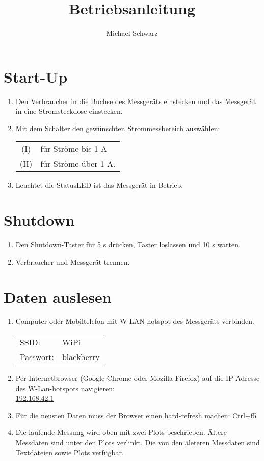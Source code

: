 \documentclass[a4paper]{article}
\title{Betriebsanleitung}
\author{Michael Schwarz}
\begin{document}
\maketitle

\section{Start-Up}
\begin{enumerate}
\item Den Verbraucher in die Buchse des Messgeräts einstecken und das Messgerät in eine Stromsteckdose einstecken.
\item Mit dem Schalter den gewünschten Strommessbereich auswählen: \\
	\begin{tabular}{c l}
		(I) & für Ströme bis 1 A \\
		(II) & für Ströme über 1 A.
	\end{tabular}
\item Leuchtet die StatusLED ist das Messgerät in Betrieb.
\end{enumerate}

\section{Shutdown}
\begin{enumerate}
	\item Den Shutdown-Taster für 5 s drücken, Taster loslassen und 10 s warten.
	\item Verbraucher und Messgerät trennen.
\end{enumerate}

\section{Daten auslesen}
\begin{enumerate}
	\item Computer oder Mobiltelefon mit W-LAN-hotspot des Messgeräts verbinden. \\
		\begin{tabular}{l l}
			SSID: & WiPi \\
			Passwort: & blackberry
		\end{tabular}
	\item Per Internetbrowser (Google Chrome oder Mozilla Firefox) auf die IP-Adresse des W-Lan-hotspots navigieren: \\
		\url{192.168.42.1}
	\item Für die neusten Daten muss der Browser einen hard-refresh machen: Ctrl+f5
	\item Die laufende Messung wird oben mit zwei Plots beschrieben. 
		Ältere Messdaten sind unter den Plots verlinkt.
		Die von den äleteren Messdaten sind Textdateien sowie Plots verfügbar.
\end{enumerate}
\end{document}
